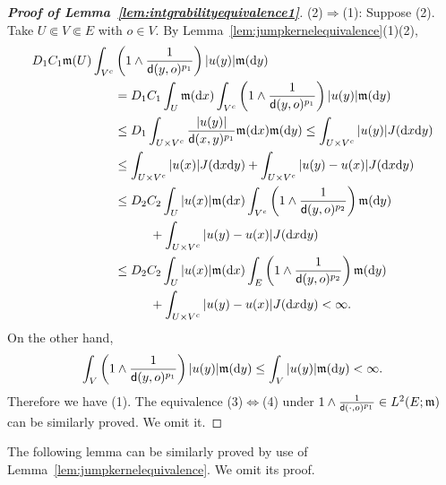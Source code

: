 \documentclass[12pt,a4paper]{article}
\renewcommand{\d}{\mathrm{d}}
\newcommand{\m}{\mathfrak{m} }
\newcommand{\1}{{\bf 1}}
\begin{document}
\begin{proof}[\bf Proof of Lemma~\ref{lem:intgrabilityequivalence1}]
(2)$\Longrightarrow$(1): Suppose (2).
Take $U\Subset V\Subset E$ with $o\in V$. 
 By Lemma~\ref{lem:jumpkernelequivalence}(1)(2), 
 \begin{align*}
 D_1C_1{\m}(U)\int_{V^c}&\left(1\land \frac{1}{{\sf d}(y,o)^{p_1}} \right)|u(y)|{\m}({\d} y)\\&=D_1C_1\int_U{\m}({\d} x)\int_{V^c}\left(1\land \frac{1}{{\sf d}(y,o)^{p_1}} \right)|u(y)|{\m}({\d} y)\\
 &\leq D_1\int_{U\times V^c}\frac{|u(y)|}{{\sf d}(x,y)^{p_1}}{\m}({\d} x)
 {\m}({\d} y)\leq\int_{U\times V^c}|u(y)|J({\d} x{\d} y)\\
 &\leq \int_{U\times V^c}|u(x)|J({\d} x{\d} y)+\int_{U\times V^c}|u(y)-u(x)|J({\d} x{\d} y)\\
 &\leq D_2C_2\int_{U}|u(x)|{\m}({\d} x)\int_{V^c}\left(1\land \frac{1}{{\sf d}(y,o)^{p_2}} \right){\m}({\d} y)\\
 &\hspace{1cm}+\int_{U\times V^c}|u(y)-u(x)|J({\d} x{\d} y)
 \\
 &\leq D_2C_2\int_{U}|u(x)|{\m}({\d} x)\int_E\left(1\land \frac{1}{{\sf d}(y,o)^{p_2}} \right){\m}({\d} y)\\
 &\hspace{1cm}+\int_{U\times V^c}|u(y)-u(x)|J({\d} x{\d} y)
  <\infty.
 \end{align*}
 On the other hand, 
 \begin{align*}
 \int_V\left(1\land \frac{1}{{\sf d}(y,o)^{p_1}} \right)|u(y)|{\m}({\d} y)\leq\int_V|u(y)|{\m}({\d} y)<\infty.
 \end{align*}
 Therefore we have (1). The equivalence (3)$\Longleftrightarrow$(4) under 
 $1\land\frac{1}{{\sf d}(\cdot,o)^{p_1}}\in L^2(E;{\m})$
 can be 
 similarly proved. We omit it. 
\end{proof}
The following lemma can be similarly proved by use of Lemma~\ref{lem:jumpkernelequivalence}. We omit its proof. 
\end{document}
